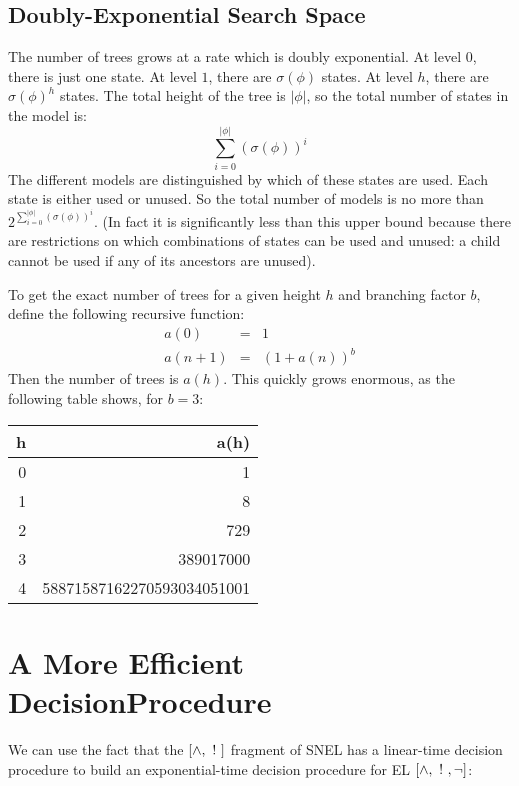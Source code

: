 \subsection{Doubly-Exponential Search Space}
The number of trees grows at a rate which is doubly exponential.
At level $0$, there is just one state.
At level $1$, there are $\sigma(\phi)$ states.
At level $h$, there are $\sigma(\phi)^h$ states.
The total height of the tree is $|\phi|$, so the total number of states in the model is:
\[
\sum_{i=0}^{|\phi|} (\sigma(\phi))^i
\]
The different models are distinguished by which of these states are used. 
Each state is either used or unused.
So the total number of models is no more than $2 ^ {\sum_{i=0}^{|\phi|} (\sigma(\phi))^i}$.
(In fact it is significantly less than this upper bound because there are restrictions on which combinations of states can be used and unused: a child cannot be used if any of its ancestors are unused).

To get the exact number of trees for a given height $h$ and branching factor $b$, define the following recursive function:
\begin{eqnarray*}
a(0) & = & 1 \\
a(n+1) & = & (1+a(n))^b 
\end{eqnarray*}
Then the number of trees is $a(h)$.
This quickly grows enormous, as the following table shows, for $b = 3$:
\begin{center}
\begin{tabular}{ r | r }
h & a(h) \\
\hline
0 & 1 \\
1 & 8 \\
2 & 729 \\
3 & 389017000 \\
4 & 58871587162270593034051001
\end{tabular}
\end{center}
    
\section{A More Efficient DecisionProcedure}
We can use the fact that the $[\land, \ ! \ ]$ fragment of SNEL has a linear-time decision procedure to build an exponential-time decision procedure for EL $[\land, \ ! \ , \neg]$:

